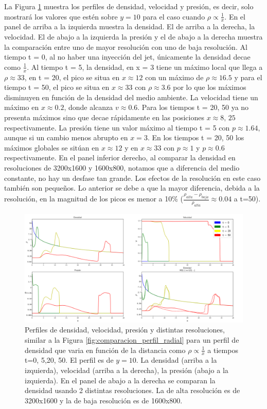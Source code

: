 \documentclass[12pt,a4paper]{book}
\begin{document}
La Figura \ref{fig:Decaimiento_lineal_densidad_jet} muestra los perfiles de densidad, velocidad y presión, es decir, 
solo mostrará los valores que estén sobre $y = 10$ {para el caso cuando $\rho \varpropto \frac{1}{x}$}. En el panel de arriba 
a la izquierda  muestra la densidad. El de arriba a la derecha, la velocidad. El de abajo a la izquierda la presión y 
el de abajo a la derecha muestra la comparación entre
uno de mayor resolución con uno de baja resolución. Al tiempo t = 0, al no haber una inyección del jet, únicamente la densidad 
decae como $\frac{1}{x}$. Al tiempo t = 5, la densidad, en x = 3 tiene un máximo local que llega a 
$\rho  \approx 33$, en t = 20, el pico se situa en $x \approx 12$ con un máximo de 
$\rho  \approx 16.5$ y para el 
tiempo t = 50, el pico se situa en $x \approx 33$ con $\rho  \approx 3.6$ por lo que los máximos disminuyen en función de la 
densidad del medio ambiente.
La velocidad tiene un máximo en $x \approx 0.2$, donde alcanza  $v \approx 0.6$. Para los tiempos t = 20, 50 ya no 
presenta máximos sino que decae rápidamente en las posiciones $x \approx 8, \, 25$ respectivamente.
La presión tiene un valor máximo al tiempo t = 5 con $p \approx 1.64$, aunque si un cambio menos abrupto en $x = 3$. 
En los tiempos t = 20, 50 los máximos globales se sitúan en $x \approx 12$ y en $x \approx 33$ 
con $p \approx  1$ y $p  \approx 0.6$ respectivamente.
En el panel inferior derecho, al comparar la densidad en resoluciones de 3200x1600 y 1600x800,
notamos que a diferencia del medio constante, no hay un desfase tan grande.  Los efectos de la resolución en este caso 
también son pequeños. Lo anterior se debe a que la mayor diferencia, debida a la resolución, 
en la magnitud de los picos es menor a 10\% ($\frac{\rho_{alta} - \rho_{baja}}{\rho_{alta}} \approx 0.04$ a t=50). 

\begin{figure}
  \centering
  \includegraphics[width = 1.0\textwidth]{./Figuras/jet/perfiles/perfiles_lineales.png}
  \caption{Perfiles de densidad, velocidad, presión y distintas resoluciones, similar a la Figura 
  \ref{fig:comparacion_perfil_radial} para un perfil de densidad que varia en función de la distancia como
  $\rho \varpropto \frac{1}{x}$ a tiempos t=0, 5,20, 50.
  El perfil es de $y = 10$.
  La densidad (arriba a la izquierda), velocidad (arriba a la derecha), la presión (abajo a la izquierda). 
  En el panel de abajo a la derecha se comparan la densidad usando 2 distintas resoluciones. La de alta resolución
  es de 3200x1600 y la de baja resolución es de 1600x800.}\label{fig:Decaimiento_lineal_densidad_jet}
\end{figure}
\end{document}
